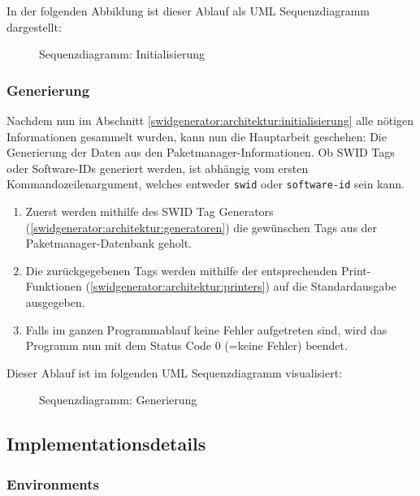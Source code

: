In der folgenden Abbildung ist dieser Ablauf als UML Sequenzdiagramm
dargestellt:

\begin{figure}[H]
	\centering
	
	\caption{Sequenzdiagramm: Initialisierung}
\end{figure}

\subsubsection{Generierung}
\label{swidgenerator:architektur:generierung}

Nachdem nun im Abschnitt \ref{swidgenerator:architektur:initialisierung} alle
nötigen Informationen gesammelt wurden, kann nun die Hauptarbeit geschehen: Die
Generierung der Daten aus den Paketmanager-Informationen. Ob SWID Tags oder
Software-IDs generiert werden, ist abhängig vom ersten Kommandozeilenargument,
welches entweder \texttt{swid} oder \texttt{software-id} sein kann.

\begin{enumerate}
	\item Zuerst werden mithilfe des SWID Tag Generators
		(\ref{swidgenerator:architektur:generatoren}) die gewünschen Tags aus
		der Paketmanager-Datenbank geholt.
	\item Die zurückgegebenen Tags werden mithilfe der entsprechenden
		Print-Funktionen (\ref{swidgenerator:architektur:printers}) auf die
		Standardausgabe ausgegeben.
	\item Falls im ganzen Programmablauf keine Fehler aufgetreten sind, wird
		das Programm nun mit dem Status Code 0 (=keine Fehler) beendet.
\end{enumerate}

Dieser Ablauf ist im folgenden UML Sequenzdiagramm visualisiert:

\begin{figure}[H]
	\centering
	
	\caption{Sequenzdiagramm: Generierung}
\end{figure}


\subsection{Implementationsdetails}

\subsubsection{Environments}
\label{swidgenerator:architektur:environments}


